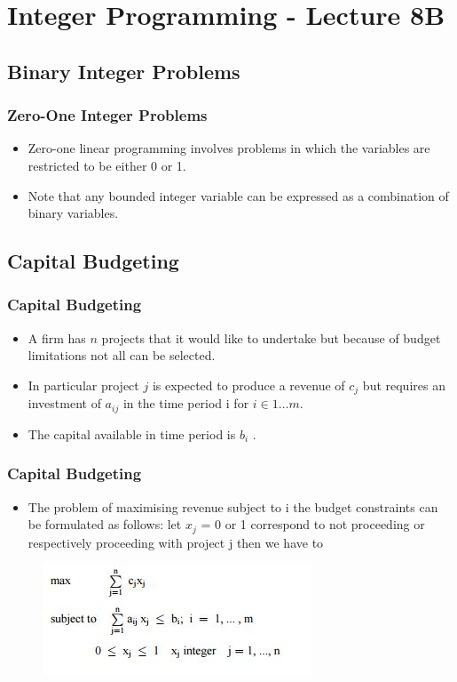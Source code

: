 \documentclass{beamer}
\begin{document}
	\section{Integer Programming - Lecture 8B}
\subsection{Binary Integer Problems}

\begin{frame}
\frametitle{Zero-One Integer Problems}
\begin{itemize}
\item Zero-one linear programming involves problems in which the variables are restricted to be either 0 or 1. 
\item Note that any bounded integer variable can be expressed as a combination of binary variables.
\end{itemize}

\end{frame}

\subsection{Capital Budgeting}
\begin{frame}
\frametitle{Capital Budgeting}
\Large
\begin{itemize}
\item	A firm has $n$ projects that it would like to undertake but because of budget limitations not all can be
	selected. 
\item In particular project $j$ is expected to produce a revenue of $c_j$ but requires an investment of $a_{ij}$ in the time period i for $i \in 1 \ldots m$. 
\item The capital available in time period  is $b_i$ . 
\end{itemize}
\end{frame}
\begin{frame}
	\frametitle{Capital Budgeting}
	\Large
	\begin{itemize}
		\item The problem of maximising revenue subject to i
	the budget constraints can be formulated as follows: let $x_j$ = 0 or 1 correspond to not proceeding or 	respectively proceeding with project j then we have to
\end{itemize}
\begin{figure}
\centering
\includegraphics[width=0.9\linewidth]{capitalbudgeting}
\end{figure}

\end{frame}
\end{document}
